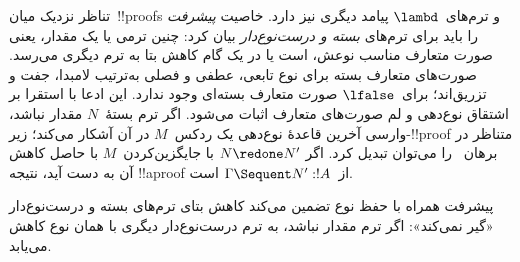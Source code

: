 \documentclass[../../../include/open-logic-section]{subfiles}
\begin{document}
تناظر نزدیک میان~!!{proof}s و ترم‌های~$\lambd$ پیامد دیگری نیز دارد.
خاصیت \emph{پیشرفت} را باید برای ترم‌های \emph{بسته و درست‌نوع‌دار}
بیان کرد: چنین ترمی یا یک مقدار، یعنی صورت متعارف مناسب نوعش، است یا
در یک گام کاهش بتا به ترم دیگری می‌رسد. صورت‌های متعارف بسته برای نوع
تابعی، عطفی و فصلی به‌ترتیب لامبدا، جفت و تزریق‌اند؛ برای~$\lfalse$
صورت متعارف بسته‌ای وجود ندارد. این ادعا با استقرا بر اشتقاق نوع‌دهی و
لم صورت‌های متعارف اثبات می‌شود. اگر ترم بستهٔ~$N$ مقدار نباشد، وارسی
آخرین قاعدهٔ نوع‌دهی یک ردکس~$M$ در آن آشکار می‌کند؛ زیر-!!{proof}
متناظر در برهان~ را می‌توان تبدیل کرد. اگر
$N \redone N'$ با جایگزین‌کردن~$M$ با حاصل کاهش آن به دست آید، نتیجه
!!a{proof} از~$\Gamma \Sequent N' : !A$ است.

پیشرفت همراه با حفظ نوع تضمین می‌کند کاهش بتای ترم‌های بسته و
درست‌نوع‌دار «گیر نمی‌کند»: اگر ترم مقدار نباشد، به ترم درست‌نوع‌دار
دیگری با همان نوع کاهش می‌یابد.
\end{document}
